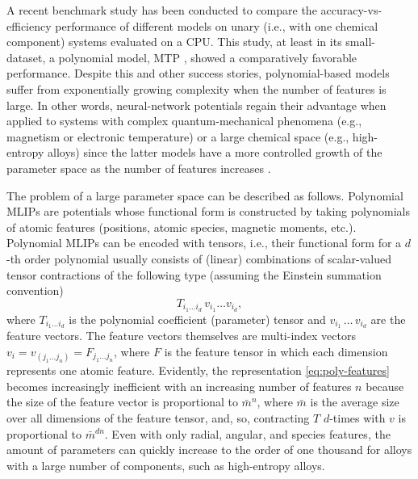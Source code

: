 A recent benchmark study \citep{zuo_performance_2020} has been conducted to compare the accuracy-vs-efficiency performance of different models on unary (i.e., with one chemical component) systems evaluated on a CPU.
This study, at least in its small-dataset, a polynomial model, MTP \cite{shapeev_moment_2016}, showed a comparatively favorable performance.
Despite this and other success stories, polynomial-based models suffer from exponentially growing complexity when the number of features is large.
In other words, neural-network potentials regain their advantage when applied to systems with complex quantum-mechanical phenomena (e.g., magnetism or electronic temperature) or a large chemical space (e.g., high-entropy alloys) since the latter models have a more controlled growth of the parameter space as the number of features increases \citep{artrith_efficient_2017,darby_compressing_2022,darby_tensorreduced_2023,lopanitsyna_modeling_2023}.

The problem of a large parameter space can be described as follows.
Polynomial MLIPs are potentials whose functional form is constructed by taking polynomials of atomic features (positions, atomic species, magnetic moments, etc.).
Polynomial MLIPs can be encoded with tensors, i.e., their functional form for a $d$-th order polynomial usually consists of (linear) combinations of scalar-valued tensor contractions of the following type (assuming the Einstein summation convention)
\begin{equation}\label{eq:poly-features}
    T_{i_1 \ldots i_d} \,
    v_{i_1} \ldots v_{i_d},
\end{equation}
where $T_{i_1 \ldots i_d}$ is the polynomial coefficient (parameter) tensor and $v_{i_1} \,\ldots\, v_{i_d}$ are the feature vectors.
The feature vectors themselves are multi-index vectors $v_i = v_{(j_1 \ldots j_n)} = F_{j_1 \ldots j_n}$, where $F$ is the feature tensor in which each dimension represents one atomic feature.
Evidently, the representation \eqref{eq:poly-features} becomes increasingly inefficient with an increasing number of features $n$ because the size of the feature vector is proportional to $\bar{m}^n$, where $\bar{m}$ is the average size over all dimensions of the feature tensor, and, so, contracting $T$ $d$-times with $v$ is proportional to $\bar{m}^{dn}$.
Even with only radial, angular, and species features, the amount of parameters can quickly increase to the order of one thousand for alloys with a large number of components, such as high-entropy alloys.


